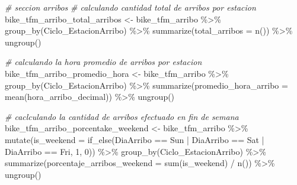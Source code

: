 \documentclass[
]{article}
\newenvironment{Shaded}{\begin{snugshade}}{\end{snugshade}}
\newcommand{\AttributeTok}[1]{\textcolor[rgb]{0.77,0.63,0.00}{#1}}
\newcommand{\CommentTok}[1]{\textcolor[rgb]{0.56,0.35,0.01}{\textit{#1}}}
\newcommand{\DecValTok}[1]{\textcolor[rgb]{0.00,0.00,0.81}{#1}}
\newcommand{\FunctionTok}[1]{\textcolor[rgb]{0.00,0.00,0.00}{#1}}
\newcommand{\NormalTok}[1]{#1}
\newcommand{\OtherTok}[1]{\textcolor[rgb]{0.56,0.35,0.01}{#1}}
\newcommand{\SpecialCharTok}[1]{\textcolor[rgb]{0.00,0.00,0.00}{#1}}
\newcommand{\StringTok}[1]{\textcolor[rgb]{0.31,0.60,0.02}{#1}}
\begin{document}
\begin{Shaded}
\begin{Highlighting}[]
\CommentTok{\#               seccion arribos}
\CommentTok{\# calculando cantidad total de arribos por estacion}
\NormalTok{bike\_tfm\_arribo\_total\_arribos }\OtherTok{\textless{}{-}}\NormalTok{ bike\_tfm\_arribo }\SpecialCharTok{\%\textgreater{}\%} 
    \FunctionTok{group\_by}\NormalTok{(Ciclo\_EstacionArribo) }\SpecialCharTok{\%\textgreater{}\%} 
    \FunctionTok{summarize}\NormalTok{(}\AttributeTok{total\_arribos =} \FunctionTok{n}\NormalTok{()) }\SpecialCharTok{\%\textgreater{}\%} 
    \FunctionTok{ungroup}\NormalTok{()}

\CommentTok{\# calculando la hora promedio de arribos por estacion}
\NormalTok{bike\_tfm\_arribo\_promedio\_hora }\OtherTok{\textless{}{-}}\NormalTok{ bike\_tfm\_arribo }\SpecialCharTok{\%\textgreater{}\%} 
    \FunctionTok{group\_by}\NormalTok{(Ciclo\_EstacionArribo) }\SpecialCharTok{\%\textgreater{}\%} 
    \FunctionTok{summarize}\NormalTok{(}\AttributeTok{promedio\_hora\_arribo =} \FunctionTok{mean}\NormalTok{(hora\_arribo\_decimal)) }\SpecialCharTok{\%\textgreater{}\%} 
    \FunctionTok{ungroup}\NormalTok{()}

\CommentTok{\# caclculando la cantidad de arribos efectuado en fin de semana}
\NormalTok{bike\_tfm\_arribo\_porcentake\_weekend }\OtherTok{\textless{}{-}}\NormalTok{ bike\_tfm\_arribo }\SpecialCharTok{\%\textgreater{}\%} 
    \FunctionTok{mutate}\NormalTok{(}\AttributeTok{is\_weekend =} \FunctionTok{if\_else}\NormalTok{(DiaArribo }\SpecialCharTok{==} \StringTok{\textquotesingle{}Sun\textquotesingle{}} \SpecialCharTok{|}
\NormalTok{                                DiaArribo }\SpecialCharTok{==} \StringTok{\textquotesingle{}Sat\textquotesingle{}} \SpecialCharTok{|}
\NormalTok{                                DiaArribo }\SpecialCharTok{==} \StringTok{\textquotesingle{}Fri\textquotesingle{}}\NormalTok{,}
                                \DecValTok{1}\NormalTok{,}
                                \DecValTok{0}\NormalTok{)) }\SpecialCharTok{\%\textgreater{}\%} 
    \FunctionTok{group\_by}\NormalTok{(Ciclo\_EstacionArribo) }\SpecialCharTok{\%\textgreater{}\%} 
    \FunctionTok{summarize}\NormalTok{(}\AttributeTok{porcentaje\_arribos\_weekend =} \FunctionTok{sum}\NormalTok{(is\_weekend) }\SpecialCharTok{/} \FunctionTok{n}\NormalTok{()) }\SpecialCharTok{\%\textgreater{}\%} 
    \FunctionTok{ungroup}\NormalTok{()}


\end{Highlighting}
\end{Shaded}
\end{document}
